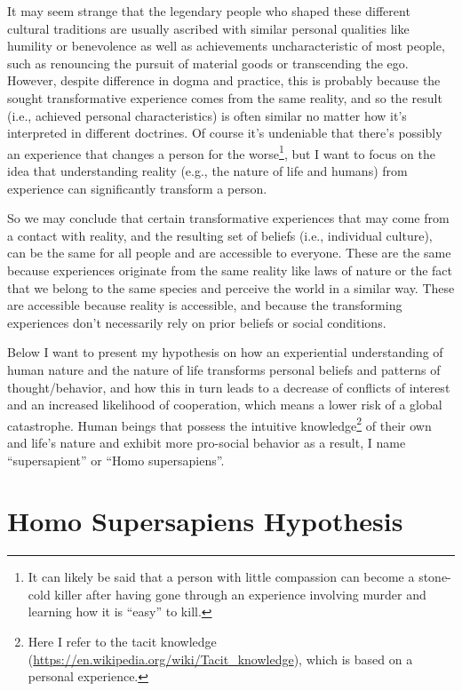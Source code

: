 \documentclass[12pt]{report}
\begin{document}
\noindent It may seem strange that the legendary people who shaped these different cultural traditions are usually ascribed with similar personal qualities like humility or benevolence as well as achievements uncharacteristic of most people, such as renouncing the pursuit of material goods or transcending the ego. However, despite difference in dogma and practice, this is probably because the sought transformative experience comes from the same reality, and so the result (i.e., achieved personal characteristics) is often similar no matter how it’s interpreted in different doctrines. Of course it’s undeniable that there’s possibly an experience that changes a person for the worse\footnote{It can likely be said that a person with little compassion can become a stone-cold killer after having gone through an experience involving murder and learning how it is ``easy'' to kill.}, but I want to focus on the idea that understanding reality (e.g., the nature of life and humans) from experience can significantly transform a person.

\noindent So we may conclude that certain transformative experiences that may come from a contact with reality, and the resulting set of beliefs (i.e., individual culture), can be the same for all people and are accessible to everyone. These are the same because experiences originate from the same reality like laws of nature or the fact that we belong to the same species and perceive the world in a similar way. These are accessible because reality is accessible, and because the transforming experiences don’t necessarily rely on prior beliefs or social conditions.

\noindent Below I want to present my hypothesis on how an experiential understanding of human nature and the nature of life transforms personal beliefs and patterns of thought/behavior, and how this in turn leads to a decrease of conflicts of interest and an increased likelihood of cooperation, which means a lower risk of a global catastrophe. Human beings that possess the intuitive knowledge\footnote{Here I refer to the tacit knowledge (\url{https://en.wikipedia.org/wiki/Tacit_knowledge}), which is based on a personal experience.} of their own and life’s nature and exhibit more pro-social behavior as a result, I name ``supersapient'' or ``Homo supersapiens''.

\section*{Homo Supersapiens Hypothesis}
\end{document}
